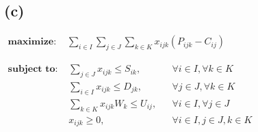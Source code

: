 \newpage

\subsection*{(c)}

$
\begin{aligned}
    \textbf{maximize: } & \sum_{i \in I} \sum_{j \in J} \sum_{k \in K} x_{ijk} (P_{ijk} - C_{ij})
\end{aligned}
$

$
\begin{aligned}
    \textbf{subject to: }
    & \sum_{j \in J} x_{ijk} \leq S_{ik}, && \forall i \in I, \forall k \in K \\
    & \sum_{i \in I} x_{ijk} \leq D_{jk}, && \forall j \in J, \forall k \in K \\
    & \sum_{k \in K} x_{ijk} W_k \leq U_{ij}, && \forall i \in I, \forall j \in J \\
    & x_{ijk} \geq 0, && \forall i \in I, j \in J, k \in K
\end{aligned}
$